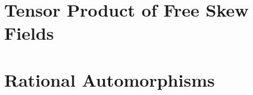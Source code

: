 \documentclass[letterpaper,reqno]{amsart}
\numberwithin{equation}{section}
\begin{document}
\section{Tensor Product of Free Skew Fields}
	\label{sec:TPFSF}






\bigskip

\section{Rational Automorphisms}
	\label{sec:RatAuts}


\end{document}
